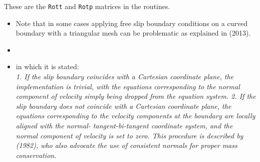 These are the {\tt Rott} and {\tt Rotp} matrices in the routines.


\Literature
\begin{itemize}
\item 
Note that in some cases applying free slip boundary conditions on a curved boundary with a triangular mesh 
can be problematic as explained in \textcite{ditu13} (2013).
\item {}
\item {} in which it is stated:\\
{\it 1. If the slip boundary coincides with a Cartesian coordinate plane, the implementation is trivial,
with the equations corresponding to the normal component of velocity simply being dropped
from the equation system.
2. If the slip boundary does not coincide with a Cartesian coordinate plane, the equations
corresponding to the velocity components at the boundary are locally aligned with the normal-
tangent-bi-tangent coordinate system, and the normal component of velocity is set to zero.
This procedure is described by \textcite{ensg82} (1982), who also advocate the use of consistent
normals for proper mass conservation.}
\end{itemize}
